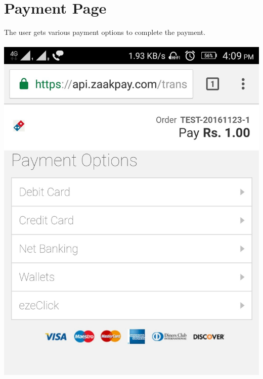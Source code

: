 \documentclass{article}
\begin{document}
\section{Payment Page}
The user gets various payment options to complete the payment.
\\ \\ \includegraphics[width=4.4 in,height=5.4 in]{Screenshot_2016-11-23-16-09-06-454.jpg}
\end{document}
